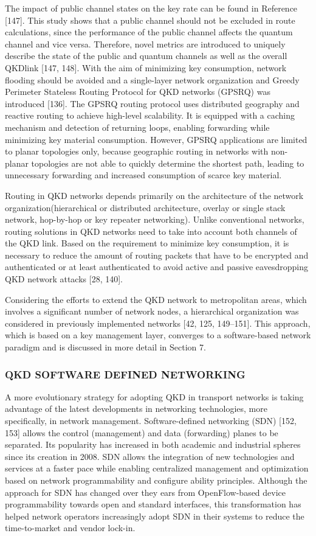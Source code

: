 The impact of public channel states on the key rate can be found in Reference [147]. This study shows that a public channel should not be excluded in route calculations, since the performance of the public channel affects the quantum channel and vice versa. Therefore, novel metrics are introduced to uniquely describe the state of the public and quantum channels as well as the overall QKDlink [147, 148]. With the aim of minimizing key consumption, network flooding should be avoided and a single-layer network organization and Greedy Perimeter Stateless Routing Protocol for QKD networks (GPSRQ) was introduced [136]. The GPSRQ routing protocol uses distributed geography and reactive routing to achieve high-level scalability. It is equipped with a caching mechanism and detection of returning loops, enabling forwarding while minimizing key material consumption. However, GPSRQ applications are limited to planar topologies only, because geographic routing in networks with non-planar topologies are not able to quickly determine the shortest path, leading to unnecessary forwarding and increased consumption of scarce key material.

Routing in QKD networks depends primarily on the architecture of the network organization(hierarchical or distributed architecture, overlay or single stack network, hop-by-hop or key repeater networking). Unlike conventional networks, routing solutions in QKD networks need to take into account both channels of the QKD link. Based on the requirement to minimize key consumption, it is necessary to reduce the amount of routing packets that have to be encrypted and authenticated or at least authenticated to avoid active and passive eavesdropping QKD network attacks [28, 140].

Considering the efforts to extend the QKD network to metropolitan areas, which involves a significant number of network nodes, a hierarchical organization was considered in previously implemented networks [42, 125, 149–151]. This approach, which is based on a key management layer, converges to a software-based network paradigm and is discussed in more detail in Section 7.

\subsubsection{QKD SOFTWARE DEFINED NETWORKING}
A more evolutionary strategy for adopting QKD in transport networks is taking advantage of the latest developments in networking technologies, more specifically, in network management.
Software-defined networking (SDN) [152, 153] allows the control (management) and data (forwarding) planes to be separated. Its popularity has increased in both academic and industrial spheres since its creation in 2008. SDN allows the integration of new technologies and services at a faster pace while enabling centralized management and optimization based on network programmability and configure ability principles. Although the approach for SDN has changed over they ears from OpenFlow-based device programmability towards open and standard interfaces, this transformation has helped network operators increasingly adopt SDN in their systems to reduce the time-to-market and vendor lock-in.

